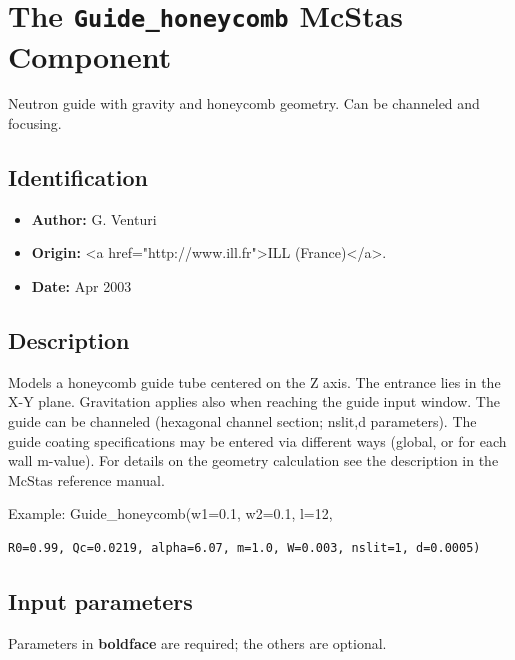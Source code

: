 \section{The \texttt{Guide\_honeycomb} McStas Component}
Neutron guide with gravity and honeycomb geometry. Can be channeled and focusing.

\subsection*{Identification}
\begin{itemize}
  \item \textbf{Author:} G. Venturi
  \item \textbf{Origin:} \textless{}a href="http://www.ill.fr"\textgreater{}ILL (France)\textless{}/a\textgreater{}.
  \item \textbf{Date:} Apr 2003
\end{itemize}

\subsection*{Description}
Models a honeycomb guide tube centered on the Z axis. The entrance lies in the X-Y plane. Gravitation applies also when reaching the guide input window. The guide can be channeled (hexagonal channel section; nslit,d parameters). The guide coating specifications may be entered via different ways (global, or for each wall m-value). For details on the geometry calculation see the description in the McStas reference manual.

Example: Guide\_honeycomb(w1=0.1, w2=0.1, l=12,

\begin{verbatim}
R0=0.99, Qc=0.0219, alpha=6.07, m=1.0, W=0.003, nslit=1, d=0.0005)
\end{verbatim}

\subsection*{Input parameters}
Parameters in \textbf{boldface} are required; the others are optional.


